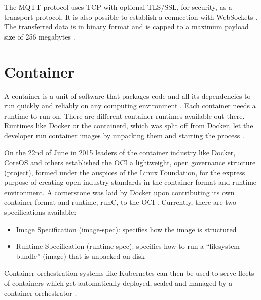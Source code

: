 The \gls{MQTT} protocol uses TCP with optional TLS/SSL, for security, as a transport protocol. It is also possible to establish a connection with WebSockets \cite{OASIS2019}. The transferred data is in binary format and is capped to a maximum payload size of 256 megabytes \cite{Naik2017}.

\section{Container}
A container is a unit of software that packages code and all its dependencies to run quickly and reliably on any computing environment \cite{dockerWhatDocker}. Each container needs a runtime to run on. There are different container runtimes available out there. Runtimes like Docker or the containerd, which was split off from Docker, let the developer run container images by unpacking them and starting the process \cite{Lewis2018}.

\bigskip
On the 22nd of June in 2015 leaders of the container industry like Docker, CoreOS and others established the \gls{OCI} a lightweight, open governance structure (project), formed under the auspices of the Linux Foundation, for the express purpose of creating open industry standards in the container format and runtime environment. A cornerstone was laid by Docker upon contributing its own container format and runtime, runC, to the \gls{OCI} \cite{TheLinuxFoundation}. Currently, there are two specifications available: \cite{TheLinuxFoundation}
\begin{itemize}
    \item Image Specification (image-spec): specifies how the image is structured
    \item Runtime Specification (runtime-spec): specifies how to run a “filesystem bundle” (image) that is unpacked on disk
\end{itemize}

\bigskip
Container orchestration systems like Kubernetes can then be used to serve fleets of containers which get automatically deployed, scaled and managed by a container orchestrator \cite{TheKubernetesAuthors}.

